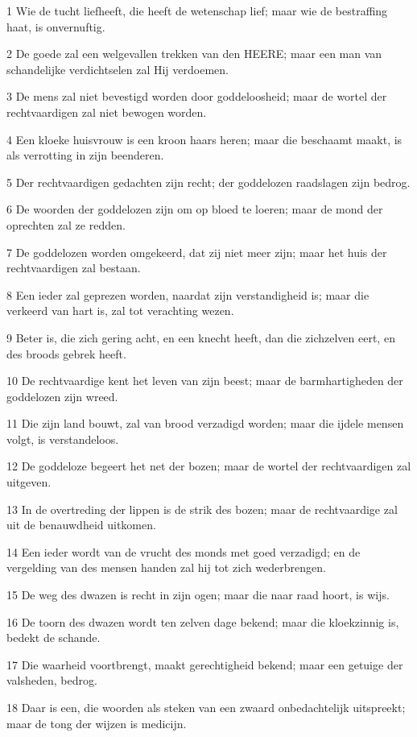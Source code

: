 \par 1 Wie de tucht liefheeft, die heeft de wetenschap lief; maar wie de bestraffing haat, is onvernuftig.
\par 2 De goede zal een welgevallen trekken van den HEERE; maar een man van schandelijke verdichtselen zal Hij verdoemen.
\par 3 De mens zal niet bevestigd worden door goddeloosheid; maar de wortel der rechtvaardigen zal niet bewogen worden.
\par 4 Een kloeke huisvrouw is een kroon haars heren; maar die beschaamt maakt, is als verrotting in zijn beenderen.
\par 5 Der rechtvaardigen gedachten zijn recht; der goddelozen raadslagen zijn bedrog.
\par 6 De woorden der goddelozen zijn om op bloed te loeren; maar de mond der oprechten zal ze redden.
\par 7 De goddelozen worden omgekeerd, dat zij niet meer zijn; maar het huis der rechtvaardigen zal bestaan.
\par 8 Een ieder zal geprezen worden, naardat zijn verstandigheid is; maar die verkeerd van hart is, zal tot verachting wezen.
\par 9 Beter is, die zich gering acht, en een knecht heeft, dan die zichzelven eert, en des broods gebrek heeft.
\par 10 De rechtvaardige kent het leven van zijn beest; maar de barmhartigheden der goddelozen zijn wreed.
\par 11 Die zijn land bouwt, zal van brood verzadigd worden; maar die ijdele mensen volgt, is verstandeloos.
\par 12 De goddeloze begeert het net der bozen; maar de wortel der rechtvaardigen zal uitgeven.
\par 13 In de overtreding der lippen is de strik des bozen; maar de rechtvaardige zal uit de benauwdheid uitkomen.
\par 14 Een ieder wordt van de vrucht des monds met goed verzadigd; en de vergelding van des mensen handen zal hij tot zich wederbrengen.
\par 15 De weg des dwazen is recht in zijn ogen; maar die naar raad hoort, is wijs.
\par 16 De toorn des dwazen wordt ten zelven dage bekend; maar die kloekzinnig is, bedekt de schande.
\par 17 Die waarheid voortbrengt, maakt gerechtigheid bekend; maar een getuige der valsheden, bedrog.
\par 18 Daar is een, die woorden als steken van een zwaard onbedachtelijk uitspreekt; maar de tong der wijzen is medicijn.
